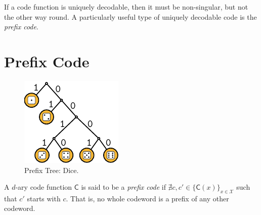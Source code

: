 \documentclass[a4paper]{article}
\begin{document}
\begin{remark}
	If a code function is uniquely decodable, then it must be non-singular,
	but not the other way round.
	A particularly useful type of uniquely decodable code is the \emph{prefix code}.
\end{remark}


\section{Prefix Code}

\begin{figure}[t]
		\centering
		\includegraphics[scale=1]{figures/prefix-tree-dice.pdf}
		\caption{Prefix Tree: Dice.}
		\label{fig:prefix-tree-dice}
\end{figure}

\begin{definition}
	A $d$-ary code function $\mathsf{C}$ is said to be a \emph{prefix code}
	if $\nexists c,c'\in\{\mathsf{C}(x)\}_{x\in\mathcal{X}}$ such that $c'$ starts with $c$.
	That is, no whole codeword is a prefix of any other codeword.
\end{definition}
\end{document}

